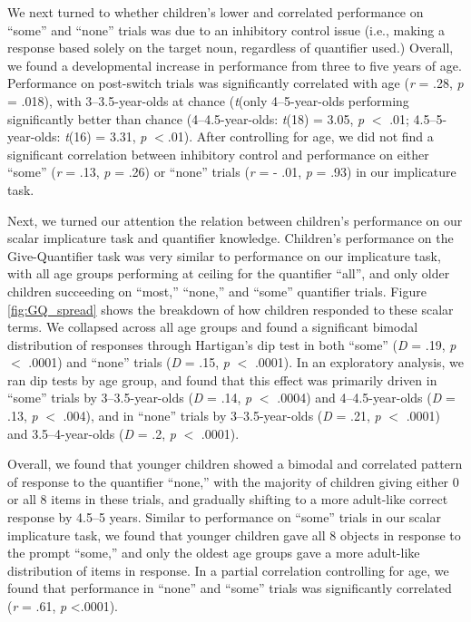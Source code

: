\documentclass[man]{apa2}
\begin{document}
We next turned to whether children's lower and correlated performance on ``some'' and ``none'' trials was due to an inhibitory control issue (i.e., making a response based solely on the target noun, regardless of quantifier used.)
Overall, we found a developmental increase in performance from three to five years of age. Performance on post-switch trials was significantly correlated with age (\textit{r} = .28, \textit{p} = .018), with 3--3.5-year-olds at chance (\emph{t}(only 4--5-year-olds performing significantly better than chance (4--4.5-year-olds: \emph{t}(18) = 3.05, \emph{p} $<$ .01; 4.5--5-year-olds: \emph{t}(16) = 3.31, \emph{p} $< $.01). After controlling for age, we did not find a significant correlation between inhibitory control and performance on either ``some'' (\textit{r} = .13, \textit{p} = .26) or ``none'' trials (\textit{r} = - .01, \textit{p} = .93) in our implicature task.

Next, we turned our attention the relation between children's performance on our scalar implicature task and quantifier knowledge. Children's performance on the Give-Quantifier task was very similar to performance on our implicature task, with all age groups performing at ceiling for the quantifier ``all'', and only older children succeeding on ``most,'' ``none,'' and ``some'' quantifier trials. Figure \ref{fig:GQ_spread} shows the breakdown of how children responded to these scalar terms. We collapsed across all age groups and found a significant bimodal distribution of responses through Hartigan's dip test in both ``some'' (\emph{D} = .19, \emph{p} $<$ .0001) and ``none'' trials (\emph{D} = .15, \emph{p} $<$ .0001). In an exploratory analysis, we ran dip tests by age group, and found that this effect was primarily driven in ``some'' trials by 3--3.5-year-olds (\emph{D} = .14, \emph{p} $<$ .0004) and 4--4.5-year-olds (\emph{D} = .13, \emph{p} $<$ .004), and in ``none'' trials by 3--3.5-year-olds (\emph{D} = .21, \emph{p} $<$ .0001) and 3.5--4-year-olds (\emph{D} = .2, \emph{p} $<$ .0001).

Overall, we found that younger children showed a bimodal and correlated pattern of response to the quantifier ``none,'' with the majority of children giving either 0 or all 8 items in these trials, and gradually shifting to a more adult-like correct response by 4.5--5 years. Similar to performance on ``some'' trials in our scalar implicature task, we found that younger children gave all 8 objects in response to the prompt ``some,'' and only the oldest age groups gave a more adult-like distribution of items in response. In a partial correlation controlling for age, we found that performance in ``none'' and ``some'' trials was significantly correlated (\textit{r} = .61, \textit{p} \textless .0001).
\end{document}
